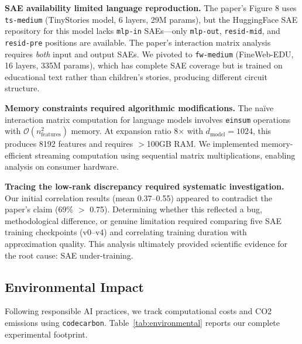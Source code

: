 \textbf{SAE availability limited language reproduction.}
The paper's Figure 8 uses \texttt{ts-medium} (TinyStories model, 6 layers, 29M params), but the HuggingFace SAE repository for this model lacks \texttt{mlp-in} SAEs---only \texttt{mlp-out}, \texttt{resid-mid}, and \texttt{resid-pre} positions are available.
The paper's interaction matrix analysis requires \emph{both} input and output SAEs.
We pivoted to \texttt{fw-medium} (FineWeb-EDU, 16 layers, 335M params), which has complete SAE coverage but is trained on educational text rather than children's stories, producing different circuit structure.

\textbf{Memory constraints required algorithmic modifications.}
The na\"ive interaction matrix computation for language models involves \texttt{einsum} operations with $\mathcal{O}(n_{\text{features}}^2)$ memory.
At expansion ratio 8$\times$ with $d_{\text{model}} = 1024$, this produces 8192 features and requires $>$100GB RAM.
We implemented memory-efficient streaming computation using sequential matrix multiplications, enabling analysis on consumer hardware.

\textbf{Tracing the low-rank discrepancy required systematic investigation.}
Our initial correlation results (mean 0.37--0.55) appeared to contradict the paper's claim (69\% $>$ 0.75).
Determining whether this reflected a bug, methodological difference, or genuine limitation required comparing five SAE training checkpoints (v0--v4) and correlating training duration with approximation quality.
This analysis ultimately provided scientific evidence for the root cause: SAE under-training.

\subsection{Environmental Impact}
\label{sec:environmental}

Following responsible AI practices, we track computational costs and CO2 emissions using \texttt{codecarbon}.
Table~\ref{tab:environmental} reports our complete experimental footprint.

